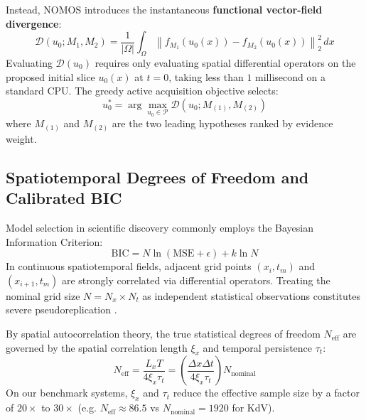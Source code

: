 \documentclass[twocolumn,10pt,a4paper]{article}
\begin{document}
Instead, NOMOS introduces the instantaneous \textbf{functional vector-field divergence}:
\begin{equation}
\mathcal{D}(u_0; M_1, M_2) = \frac{1}{|\Omega|} \int_{\Omega} \left\| f_{M_1}(u_0(x)) - f_{M_2}(u_0(x)) \right\|_2^2 \, dx
\label{eq:divergence}
\end{equation}
Evaluating $\mathcal{D}(u_0)$ requires only evaluating spatial differential operators on the proposed initial slice $u_0(x)$ at $t=0$, taking less than $1$ millisecond on a standard CPU. The greedy active acquisition objective selects:
\begin{equation}
u_0^* = \arg\max_{u_0 \in \mathcal{P}} \mathcal{D}(u_0; M_{(1)}, M_{(2)})
\end{equation}
where $M_{(1)}$ and $M_{(2)}$ are the two leading hypotheses ranked by evidence weight.

\subsection{Spatiotemporal Degrees of Freedom and Calibrated BIC}
Model selection in scientific discovery commonly employs the Bayesian Information Criterion:
\begin{equation}
\text{BIC} = N \ln(\text{MSE} + \epsilon) + k \ln N
\end{equation}
In continuous spatiotemporal fields, adjacent grid points $(x_i, t_m)$ and $(x_{i+1}, t_m)$ are strongly correlated via differential operators. Treating the nominal grid size $N = N_x \times N_t$ as independent statistical observations constitutes severe pseudoreplication \cite{bretherton1999effective, cressie1993statistics}.

By spatial autocorrelation theory, the true statistical degrees of freedom $N_{\text{eff}}$ are governed by the spatial correlation length $\xi_x$ and temporal persistence $\tau_t$:
\begin{equation}
N_{\text{eff}} = \frac{L_x T}{4 \xi_x \tau_t} = \left(\frac{\Delta x \Delta t}{4 \xi_x \tau_t}\right) N_{\text{nominal}}
\end{equation}
On our benchmark systems, $\xi_x$ and $\tau_t$ reduce the effective sample size by a factor of $20\times$ to $30\times$ (e.g. $N_{\text{eff}} \approx 86.5$ vs $N_{\text{nominal}} = 1920$ for KdV).
\end{document}
